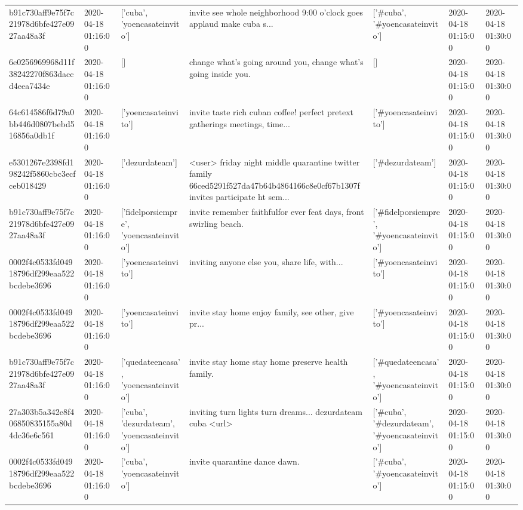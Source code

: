 \begin{tabular}{lllllll}
b91c730aff9e75f7c21978d6bfe427e0927aa48a3f & 2020-04-18 01:16:00 & ['cuba', 'yoencasateinvito'] & invite see whole neighborhood 9:00 o'clock goes applaud make cuba s... & ['#cuba', '#yoencasateinvito'] & 2020-04-18 01:15:00 & 2020-04-18 01:30:00 \\
6e0256969968d11f38242270f863daccd4eea7434e & 2020-04-18 01:16:00 & [] & change what's going around you, change what's going inside you. & [] & 2020-04-18 01:15:00 & 2020-04-18 01:30:00 \\
64c614586f6d79a0bb446d0807bebd516856a0db1f & 2020-04-18 01:16:00 & ['yoencasateinvito'] & invite taste rich cuban coffee! perfect pretext gatherings meetings, time... & ['#yoencasateinvito'] & 2020-04-18 01:15:00 & 2020-04-18 01:30:00 \\
e5301267e2398fd198242f5860cbc3ecfceb018429 & 2020-04-18 01:16:00 & ['dezurdateam'] & <user> friday night middle quarantine twitter family 66ced5291f527da47b64b4864166c8e0cf67b1307f invites participate ht sem... & ['#dezurdateam'] & 2020-04-18 01:15:00 & 2020-04-18 01:30:00 \\
b91c730aff9e75f7c21978d6bfe427e0927aa48a3f & 2020-04-18 01:16:00 & ['fidelporsiempre', 'yoencasateinvito'] & invite remember faithfulfor ever feat days, front swirling beach. & ['#fidelporsiempre', '#yoencasateinvito'] & 2020-04-18 01:15:00 & 2020-04-18 01:30:00 \\
0002f4c0533fd04918796df299eaa522bcdebe3696 & 2020-04-18 01:16:00 & ['yoencasateinvito'] & inviting anyone else you, share life, with... & ['#yoencasateinvito'] & 2020-04-18 01:15:00 & 2020-04-18 01:30:00 \\
0002f4c0533fd04918796df299eaa522bcdebe3696 & 2020-04-18 01:16:00 & ['yoencasateinvito'] & invite stay home enjoy family, see other, give pr... & ['#yoencasateinvito'] & 2020-04-18 01:15:00 & 2020-04-18 01:30:00 \\
b91c730aff9e75f7c21978d6bfe427e0927aa48a3f & 2020-04-18 01:16:00 & ['quedateencasa', 'yoencasateinvito'] & invite stay home stay home preserve health family. & ['#quedateencasa', '#yoencasateinvito'] & 2020-04-18 01:15:00 & 2020-04-18 01:30:00 \\
27a303b5a342e8f406850835155a80d4dc36e6c561 & 2020-04-18 01:16:00 & ['cuba', 'dezurdateam', 'yoencasateinvito'] & inviting turn lights turn dreams... dezurdateam cuba <url> & ['#cuba', '#dezurdateam', '#yoencasateinvito'] & 2020-04-18 01:15:00 & 2020-04-18 01:30:00 \\
0002f4c0533fd04918796df299eaa522bcdebe3696 & 2020-04-18 01:16:00 & ['cuba', 'yoencasateinvito'] & invite quarantine dance dawn. & ['#cuba', '#yoencasateinvito'] & 2020-04-18 01:15:00 & 2020-04-18 01:30:00 \\

\end{tabular}
